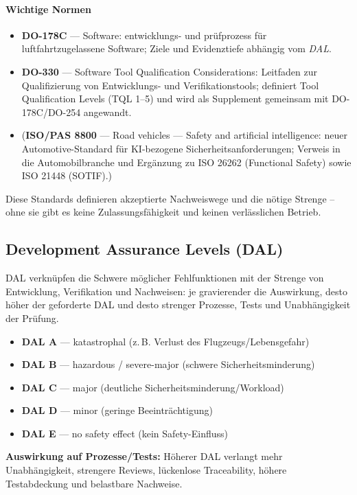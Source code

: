 \paragraph{Wichtige Normen}
\begin{itemize}
  \item \textbf{DO-178C} — Software: entwicklungs- und prüfprozess für luftfahrtzugelassene Software; Ziele und Evidenztiefe abhängig vom \emph{DAL}.
  \item \textbf{DO-330} — Software Tool Qualification Considerations: Leitfaden zur Qualifizierung von Entwicklungs- und Verifikationstools; definiert Tool Qualification Levels (TQL 1–5) und wird als Supplement gemeinsam mit DO-178C/DO-254 angewandt.
  \item (\textbf{ISO/PAS 8800} — Road vehicles — Safety and artificial intelligence: neuer Automotive-Standard für KI-bezogene Sicherheitsanforderungen; Verweis in die Automobilbranche und Ergänzung zu ISO 26262 (Functional Safety) sowie ISO 21448 (SOTIF).)
\end{itemize}

Diese Standards definieren akzeptierte Nachweiswege und die nötige Strenge – ohne sie gibt es keine Zulassungsfähigkeit und keinen verlässlichen Betrieb.

\subsection{Development Assurance Levels (DAL)}
DAL verknüpfen die Schwere möglicher Fehlfunktionen mit der Strenge von Entwicklung, Verifikation und Nachweisen: je gravierender die Auswirkung, desto höher der geforderte DAL und desto strenger Prozesse, Tests und Unabhängigkeit der Prüfung.
\begin{itemize}
  \item \textbf{DAL A} — katastrophal (z.\,B. Verlust des Flugzeugs/Lebensgefahr)
  \item \textbf{DAL B} — hazardous / severe-major (schwere Sicherheitsminderung)
  \item \textbf{DAL C} — major (deutliche Sicherheitsminderung/Workload)
  \item \textbf{DAL D} — minor (geringe Beeinträchtigung)
  \item \textbf{DAL E} — no safety effect (kein Safety-Einfluss)
\end{itemize}
\textbf{Auswirkung auf Prozesse/Tests:} Höherer DAL verlangt mehr Unabhängigkeit, strengere Reviews, lückenlose Traceability, höhere Testabdeckung und belastbare Nachweise.

